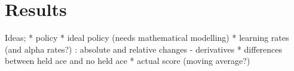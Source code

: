 \section{Results}



Ideas;
* policy
* ideal policy (needs mathematical modelling)
* learning rates (and alpha rates?) : absolute and relative changes - derivatives
* differences between held ace and no held ace
* actual score (moving average?)